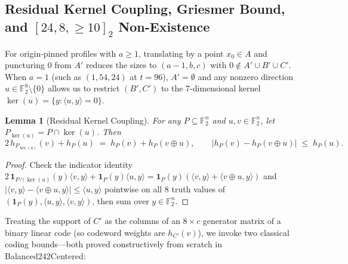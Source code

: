 \documentclass[11pt]{article}
\newtheorem{lemma}[theorem]{Lemma}
\theoremstyle{definition}
\newcommand{\F}{\mathbb{F}}
\newcommand{\ind}{\mathbf{1}}
\newcommand{\code}[1]{{\ttfamily\small\renewcommand{\_}{\textunderscore\allowbreak}#1}}
\begin{document}
\subsection{Residual Kernel Coupling, Griesmer Bound, and $[24, 8, \ge 10]_2$ Non-Existence}
\label{sec:coding}

For origin-pinned profiles with $a \ge 1$, translating by a point $x_0 \in A$ and puncturing $0$ from $A'$ reduces the sizes to $(a-1, b, c)$ with $0 \notin A' \cup B' \cup C'$.
When $a = 1$ (such as $(1, 54, 24)$ at $t = 96$), $A' = \emptyset$ and any nonzero direction $u \in \F_2^8 \setminus \{0\}$ allows us to restrict $(B', C')$ to the $7$-dimensional kernel $\ker(u) = \{y : \langle u, y \rangle = 0\}$.

\begin{lemma}[Residual Kernel Coupling]
\label{lem:residual}
For any $P \subseteq \F_2^n$ and $u, v \in \F_2^n$, let $P_{\ker(u)} = P \cap \ker(u)$. Then
\[
  2\, h_{P_{\ker(u)}}(v) + h_P(u) \;=\; h_P(v) + h_P(v \oplus u),
  \qquad
  \bigl|h_P(v) - h_P(v \oplus u)\bigr| \;\le\; h_P(u).
\]
\end{lemma}
\begin{proof}
Check the indicator identity $2\,\ind_{P \cap \ker(u)}(y)\langle v, y \rangle + \ind_P(y)\langle u, y \rangle = \ind_P(y)(\langle v, y\rangle + \langle v \oplus u, y\rangle)$ and $|\langle v, y \rangle - \langle v \oplus u, y\rangle| \le \langle u, y \rangle$ pointwise on all $8$ truth values of $(\ind_P(y), \langle u, y\rangle, \langle v, y\rangle)$, then sum over $y \in \F_2^n$.
\end{proof}

Treating the support of $C'$ as the columns of an $8 \times c$ generator matrix of a binary linear code (so codeword weights are $h_{C'}(v)$), we invoke two classical coding bounds---both proved constructively from scratch in \code{Balanced242Centered}:
\end{document}
